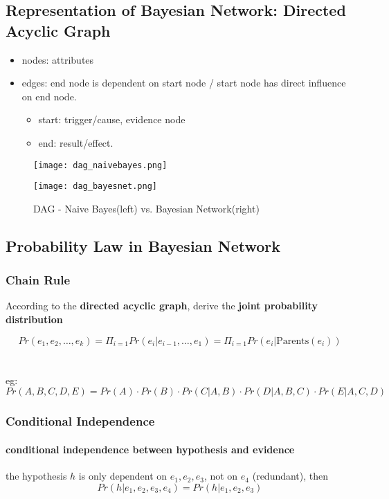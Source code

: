 \subsection{Representation of Bayesian Network: Directed Acyclic Graph}
\begin{itemize}
		\item nodes: attributes
		\item edges: end node is dependent on start node / start node has direct influence on end node.
		\begin{itemize}
			\item start: trigger/cause, evidence node
			\item end: result/effect. 
		\end{itemize}
	\end{itemize}

\begin{figure}[H]
	\centering
	\begin{minipage}{0.5\textwidth}
		\centering
		\texttt{[image: dag\_naivebayes.png]}
	\end{minipage}%
	\begin{minipage}{.5\textwidth}
		\centering
		\texttt{[image: dag\_bayesnet.png]}
	\end{minipage}
	\caption{DAG - Naive Bayes(left) vs. Bayesian Network(right)}
\end{figure}
\subsection{Probability Law in Bayesian Network}
\subsubsection{Chain Rule}
According to the \textbf{directed acyclic graph}, derive the \textbf{joint probability distribution} 
	
	$$Pr(e_1, e_2, \dots, e_k) = \Pi_{i=1} Pr(e_i| e_{i-1}, \dots, e_1) = \Pi_{i=1} Pr(e_i| \text{Parents}(e_i))$$
\\ \ \\	
eg: $Pr(A,B,C,D,E) = Pr(A)\cdot Pr(B) \cdot Pr(C|A,B) \cdot Pr(D|A,B,C) \cdot Pr(E|A,C,D)$


\subsubsection{Conditional Independence}
\paragraph{conditional independence between hypothesis and evidence} the hypothesis $h$ is only dependent on $e_1, e_2, e_3$, not on $e_4$ (redundant), then 
	 $$Pr(h | e_1, e_2, e_3, e_4) = Pr(h | e_1, e_2, e_3) $$

